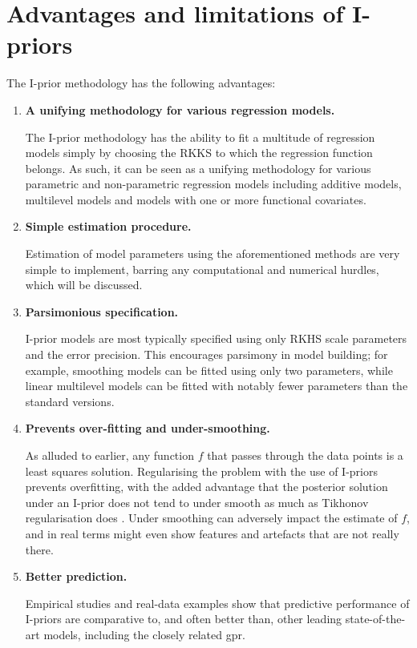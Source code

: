 \documentclass[11pt,twoside,openright,showframe]{report}
\begin{document}
\section{Advantages and limitations of I-priors}

The I-prior methodology has the following advantages:

\begin{enumerate}
  \item \textbf{A unifying methodology for various regression models.}
  
  The I-prior methodology has the ability to fit a multitude of regression models simply by choosing the RKKS to which the regression function belongs.
  As such, it can be seen as a unifying methodology for various parametric and non-parametric regression models including additive models, multilevel models and models with one or more functional covariates. 

  \item \textbf{Simple estimation procedure.}
  
  Estimation of model parameters using the aforementioned methods are very simple to implement, barring any computational and numerical hurdles, which will be discussed.

  \item \textbf{Parsimonious specification.}
  
  I-prior models are most typically specified using only  RKHS scale parameters and the error precision.
  This encourages parsimony in model building; for example, smoothing models can be fitted using only two parameters, while linear multilevel models can be fitted with notably fewer parameters than the standard versions.
  
  \item \textbf{Prevents over-fitting and under-smoothing.}
  
  As alluded to earlier, any function $f$ that passes through the data points is a least squares solution.
  Regularising the problem with the use of I-priors prevents overfitting, with the added advantage that the posterior solution under an I-prior does not tend to under smooth as much as Tikhonov regularisation does \citep{bergsma2017}.
  Under smoothing can adversely impact the estimate of $f$, and in real terms might even show features and artefacts that are not really there.
  
  \item \textbf{Better prediction.}
  
  Empirical studies and real-data examples show that predictive performance of I-priors are comparative to, and often better than, other leading state-of-the-art models, including the closely related \gls*{gpr}.


\end{enumerate}
\end{document}
